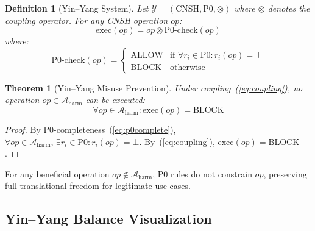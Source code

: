 \documentclass[conference]{IEEEtran}
\newtheorem{theorem}{Theorem}
\newtheorem{definition}{Definition}
\begin{document}
\begin{definition}[Yin--Yang System]
Let $\mathcal{Y} = (\text{CNSH}, \text{P0}, \otimes)$ where
$\otimes$ denotes the coupling operator.
For any CNSH operation $op$:
\begin{equation}
  \text{exec}(op) = op \otimes \text{P0-check}(op)
  \label{eq:coupling}
\end{equation}
where:
\begin{equation}
  \text{P0-check}(op) =
  \begin{cases}
    \text{ALLOW} & \text{if } \forall r_i \in \text{P0}:
      r_i(op) = \top \\
    \text{BLOCK} & \text{otherwise}
  \end{cases}
\end{equation}
\end{definition}

\begin{theorem}[Yin--Yang Misuse Prevention]
Under coupling~(\ref{eq:coupling}), no operation
$op \in \mathcal{A}_{\text{harm}}$ can be executed:
\begin{equation}
  \forall op \in \mathcal{A}_{\text{harm}}:
  \text{exec}(op) = \text{BLOCK}
\end{equation}
\end{theorem}

\begin{proof}
By P0-completeness~(\ref{eq:p0complete}),
$\forall op \in \mathcal{A}_{\text{harm}},\,
\exists r_i \in \text{P0}: r_i(op) = \bot$.
By~(\ref{eq:coupling}), $\text{exec}(op) = \text{BLOCK}$.
\end{proof}

\begin{corollary}
For any beneficial operation $op \notin \mathcal{A}_{\text{harm}}$,
P0 rules do not constrain $op$, preserving full translational
freedom for legitimate use cases.
\end{corollary}

\subsection{Yin--Yang Balance Visualization}
\end{document}
